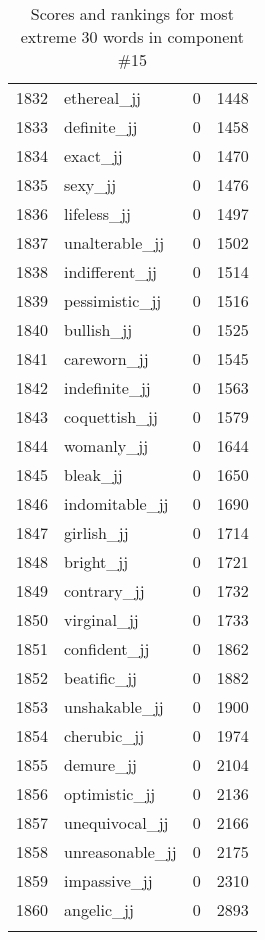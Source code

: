 \begin{longtable}[!htbp]{| rlr@{.}l |}
    1832 & ethereal\_jj & 0 & 1448 \\
    1833 & definite\_jj & 0 & 1458 \\
    1834 & exact\_jj & 0 & 1470 \\
    1835 & sexy\_jj & 0 & 1476 \\
    1836 & lifeless\_jj & 0 & 1497 \\
    1837 & unalterable\_jj & 0 & 1502 \\
    1838 & indifferent\_jj & 0 & 1514 \\
    1839 & pessimistic\_jj & 0 & 1516 \\
    1840 & bullish\_jj & 0 & 1525 \\
    1841 & careworn\_jj & 0 & 1545 \\
    1842 & indefinite\_jj & 0 & 1563 \\
    1843 & coquettish\_jj & 0 & 1579 \\
    1844 & womanly\_jj & 0 & 1644 \\
    1845 & bleak\_jj & 0 & 1650 \\
    1846 & indomitable\_jj & 0 & 1690 \\
    1847 & girlish\_jj & 0 & 1714 \\
    1848 & bright\_jj & 0 & 1721 \\
    1849 & contrary\_jj & 0 & 1732 \\
    1850 & virginal\_jj & 0 & 1733 \\
    1851 & confident\_jj & 0 & 1862 \\
    1852 & beatific\_jj & 0 & 1882 \\
    1853 & unshakable\_jj & 0 & 1900 \\
    1854 & cherubic\_jj & 0 & 1974 \\
    1855 & demure\_jj & 0 & 2104 \\
    1856 & optimistic\_jj & 0 & 2136 \\
    1857 & unequivocal\_jj & 0 & 2166 \\
    1858 & unreasonable\_jj & 0 & 2175 \\
    1859 & impassive\_jj & 0 & 2310 \\
    1860 & angelic\_jj & 0 & 2893 \\
    \hline
    \caption{Scores and rankings for most extreme 30 words in component \#15} \\
\end{longtable}
